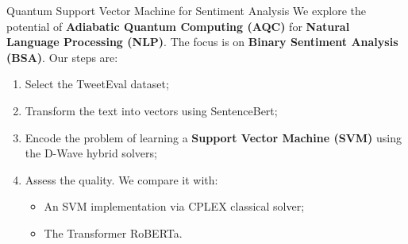 \begin{block}{Quantum Support Vector Machine for Sentiment Analysis}
    We explore the potential of \textbf{Adiabatic Quantum Computing (AQC)} for \textbf{Natural Language Processing (NLP)}. The focus is on \textbf{Binary Sentiment Analysis (BSA)}. 
    Our steps are:

    \begin{enumerate} 
        \item Select the TweetEval dataset\cite{TweetEval}; 
        \item Transform the text into vectors using SentenceBert\cite{SentenceBert}; 
        \item Encode the problem of learning a \textbf{Support Vector Machine (SVM)} using the D-Wave hybrid solvers; 
        \item Assess the quality. We compare it with:
        \begin{itemize}
            \item An SVM implementation via CPLEX classical solver;
            \item The Transformer RoBERTa\cite{roberta}.
        \end{itemize} 
    \end{enumerate}
\end{block}